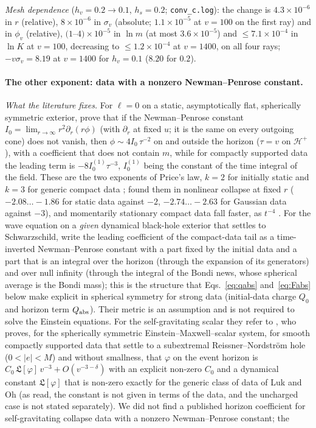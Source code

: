 \documentclass[11pt]{article}
\begin{document}
\emph{Mesh dependence} ($h_v=0.2\to0.1$, $h_s=0.2$; \texttt{conv\_c.log}): the change is $4.3\times10^{-6}$ in $r$ (relative), $8\times10^{-6}$ in $\sigma_v$ (absolute; $1.1\times10^{-5}$ at $v=100$ on the first ray) and in $\phi_v$ (relative), $(1$--$4)\times10^{-5}$ in $\ln m$ (at most $3.6\times10^{-5}$) and $\le7.1\times10^{-4}$ in $\ln K$ at $v=100$, decreasing to $\le1.2\times10^{-4}$ at $v=1400$, on all four rays; $-v\sigma_v=8.19$ at $v=1400$ for $h_v=0.1$ ($8.20$ for $0.2$).

\paragraph{The other exponent: data with a nonzero Newman--Penrose constant.} \emph{What the literature fixes.} For $\ell=0$ on a static, asymptotically flat, spherically symmetric exterior, \citet{AngelopoulosAretakisGajic2018} prove that if the Newman--Penrose constant $I_0=\lim_{r\to\infty}r^{2}\partial_r(r\phi)$ (with $\partial_r$ at fixed $u$; it is the same on every outgoing cone) does not vanish, then $\phi\sim4I_0\,\tau^{-2}$ on and outside the horizon ($\tau=v$ on $\mathcal H^{+}$), with a coefficient that does not contain $m$, while for compactly supported data the leading term is $-8I_0^{(1)}\tau^{-3}$, $I_0^{(1)}$ being the constant of the time integral of the field. These are the two exponents of Price's law, $k=2$ for initially static and $k=3$ for generic compact data \citep{Price1972,GundlachPricePullin1994}; \citet{GundlachPricePullin1994b} found them in nonlinear collapse at fixed $r$ ($-2.08\ldots-1.86$ for static data against $-2$, $-2.74\ldots-2.63$ for Gaussian data against $-3$), and momentarily stationary compact data fall faster, as $t^{-4}$ \citep{KarkowskiSwierczynskiMalec2004,PriceBurko2004}. For the wave equation on a \emph{given} dynamical black-hole exterior that settles to Schwarzschild, \citet{GajicKehrberger2025} write the leading coefficient of the compact-data tail as a time-inverted Newman--Penrose constant with a part fixed by the initial data and a part that is an integral over the horizon (through the expansion of its generators) and over null infinity (through the integral of the Bondi news, whose spherical average is the Bondi mass); this is the structure that Eqs.~\eqref{eq:qabs} and~\eqref{eq:Fabs} below make explicit in spherical symmetry for strong data (initial-data charge $Q_0$ and horizon term $Q_{\rm abs}$). Their metric is an assumption and is not required to solve the Einstein equations. For the self-gravitating scalar they refer to \citet{Gautam2024}, who proves, for the spherically symmetric Einstein--Maxwell--scalar system, for smooth compactly supported data that settle to a subextremal Reissner--Nordstr\"om hole ($0<|e|<M$) and without smallness, that $\varphi$ on the event horizon is $C_0\,\mathfrak L[\varphi]\,v^{-3}+O(v^{-3-\delta})$ with an explicit non-zero $C_0$ and a dynamical constant $\mathfrak L[\varphi]$ that is non-zero exactly for the generic class of data of Luk and Oh (as read, the constant is not given in terms of the data, and the uncharged case is not stated separately). We did not find a published horizon coefficient for self-gravitating collapse data with a nonzero Newman--Penrose constant; the 
\end{document}
